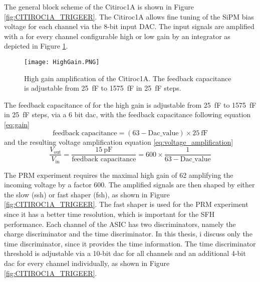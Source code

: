 The general block scheme of the Citiroc1A is shown in Figure \ref{fig:CITIROC1A_TRIGEER}.
\newline
The Citiroc1A allows fine tuning of the SiPM bias voltage for each channel via the 8-bit input DAC.
\newline	
The input signals are amplified with a for every channel configurable high or low gain by an integrator as depicted in Figure \ref{HighGain}.
\begin{figure}[h]
    \centering
    \texttt{[image: HighGain.PNG]}
    \caption{High gain amplification of the Citiroc1A. The feedback capacitance is adjustable from \SI{25}{\femto\farad} to \SI{1575}{\femto\farad} in \SI{25}{\femto\farad} steps.\autocite{datasheetCITIROC}}
    \label{HighGain}
\end{figure}
The feedback capacitance of for the high gain is adjustable from \SI{25}{\femto\farad} to \SI{1575}{\femto\farad} in \SI{25}{\femto\farad} steps, via a 6 bit dac, with the feedback capacitance following equation \ref{eq:gain}
\begin{equation}
    \text{feedback capacitance} = (63 - \text{Dac\_value}) \times \SI{25}{\femto\farad}
    \label{eq:gain}
\end{equation}
and the resulting voltage amplification equation \ref{eq:voltage_amplification} 
\begin{equation}
    \frac{V_{\text{out}}}{V_{\text{in}}} = \frac{\SI{15}{\pico\farad}}{\text{feedback capacitance}} = 600 \times \frac{1}{63 - \text{Dac\_value}}
       \label{eq:voltage_amplification}
   \end{equation}
\autocite{datasheetCITIROC}

The PRM experiment requires the maximal high gain of 62 amplifying the incoming voltage by a factor 600.\autocite{InternalcommunicationIgor}
\newline
The amplified signals are then shaped by either the slow (ssh) or fast shaper (fsh), as shown in Figure \ref{fig:CITIROC1A_TRIGEER}. 
The fast shaper is used for the PRM experiment since it has a better time resolution, which is important for the SFH performance.\autocite{datasheetCITIROC}
\newline
Each channel of the ASIC has two discriminators, namely the charge discriminator and the time discriminator. In this thesis, i discuss only the time discriminator,
since it provides the time information.
The time discriminator threshold is adjustable via a 10-bit dac for all channels and an additional 4-bit dac for every channel individually, as shown in Figure \ref{fig:CITIROC1A_TRIGEER}\autocite{datasheetCITIROC}.


